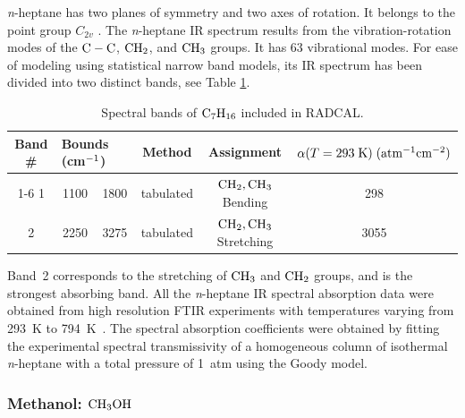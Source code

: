\textit{n}-heptane has two planes of symmetry and two axes of rotation. It belongs to the point group $C_{2v}$ \cite{III2011}. The \textit{n}-heptane IR spectrum results from the vibration-rotation modes of the $\rm C-C$, $\rm CH_2$, and $\rm CH_3$ groups. It has 63 vibrational modes. For ease of modeling using statistical narrow band models, its IR spectrum has been divided into two distinct bands, see Table \ref{Table::C7H16}.
\begin{table}[ht]
   \centering
   \caption[Spectral bands of $\rm C_7H_{16}$ included in RADCAL]{Spectral bands of $\rm C_7H_{16}$ included in RADCAL.}
   \vspace{0.1in}
   \label{Table::C7H16}
   \begin{tabular}{|c|c|c|c|c|c|}
    \hline
    Band \# & \multicolumn{2}{|l|}{Bounds (cm$\rm ^{-1}$) } & Method & Assignment & $\alpha(T=293 \; {\rm K}) \; (\rm {atm^{-1} cm^{-2}})$\\
    \cline{1-6}
    1 & 1100  & 1800 & tabulated &  $\rm CH_2, CH_3$ Bending    & 298 \\
    2 & 2250  & 3275 & tabulated &  $\rm CH_2, CH_3$ Stretching & 3055 \\
    \hline
   \end{tabular}
\end{table}
Band~2 corresponds to the stretching of $\rm CH_3$ and $\rm CH_2$ groups, and is the strongest absorbing band. All the \textit{n}-heptane IR spectral absorption data were obtained from high resolution FTIR experiments with temperatures varying from 293~K to 794~K~\cite{Wakatsuki:2005}. The spectral absorption coefficients were obtained by fitting the experimental spectral transmissivity of a homogeneous column of isothermal \textit{n}-heptane with a total pressure of 1~atm using the Goody model.

\subsubsection{Methanol: $\rm CH_3OH$}

